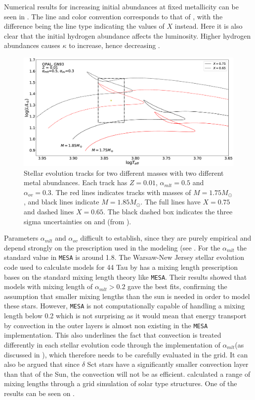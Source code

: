 Numerical results for increasing initial abundances at fixed metallicity can be seen in . The line and color convention corresponds to that of , with the difference being the line type indicating the values of $X$ instead. Here it is also clear that the initial hydrogen abundance affects the luminosity. Higher hydrogen abundances causes $\kappa$ to increase, hence decreasing \lum.

\begin{figure}[htbp]
	\centering
	\includegraphics[width=1\textwidth]{test_x.eps}
	\caption{Stellar evolution tracks for two different masses with two different metal abundances. Each track has $Z=0.01$, $\alpha_{mlt}=0.5$ and $\alpha_{ov}=0.3$. The red lines indicates tracks with masses of $M=1.75M_\odot$, and black lines indicate $M=1.85M_\odot$. The full lines have $X = 0.75$ and dashed lines $X = 0.65$. The black dashed box indicates the three sigma uncertainties on \lum and \teff (from \citet{lenz2010delta}).}
	\label{diffx}
\end{figure}

 Parameters $\alpha_{mlt}$ and $\alpha_{ov}$ difficult to establish, since they are purely empirical and depend strongly on the prescription used in the modeling (see . For the $\alpha_{mlt}$ the standard value in \texttt{MESA} is around 1.8. The Warsaw-New Jersey stellar evolution code used to calculate models for 44 Tau by \citet{lenz2010delta} has a mixing length prescription bases on the standard mixing length theory like \texttt{MESA}. Their results showed that models with mixing length of $\alpha_{mlt} > 0.2$ gave the best fits, confirming the assumption that smaller mixing lengths than the sun is needed in order to model these stars. However, \texttt{MESA} is not computationally capable of handling a mixing length below 0.2 which is not surprising as it would mean that energy transport by convection in the outer layers is almost non existing in the  \texttt{MESA} implementation. This also underlines the fact that convection is treated differently in each stellar evolution code through the implementation of $\alpha_{mlt}$(as discussed in ), which therefore needs to be carefully evaluated in the grid. It can also be argued that since $\delta$ Sct stars have a significantly smaller convection layer than that of the Sun, the convection will not be as efficient.  \citet{trampedach2011mass} calculated a range of mixing lengths through a grid simulation of solar type structures. One of the results can be seen on . 

